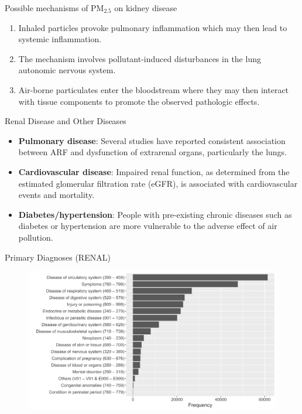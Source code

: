 \documentclass[handout]{beamer} %
\begin{document}
\begin{frame}{Possible mechanisms of PM$_{2.5}$ on kidney disease}
    \begin{enumerate}
        \item Inhaled particles provoke pulmonary inflammation which may then lead to systemic inflammation.
        \item The mechanism involves pollutant-induced disturbances in the lung autonomic nervous system.
        \item Air-borne particulates enter the bloodstream where they may then interact with tissue components to promote the observed pathologic effects. 
    \end{enumerate}
\end{frame}

\begin{frame}{Renal Disease and Other Diseases}
    \begin{itemize}
        \item \textbf{Pulmonary disease}: Several studies have reported consistent association between ARF and dysfunction of extrarenal organs, particularly the lungs.
        \item \textbf{Cardiovascular disease}: Impaired renal function, as determined from the estimated glomerular filtration rate (eGFR), is associated with cardiovascular events and mortality.
        \item \textbf{Diabetes/hypertension}: People with pre-existing chronic diseases such as diabetes or hypertension are more vulnerable to the adverse effect of air pollution.
    \end{itemize}
\end{frame}

\begin{frame}{Primary Diagnoses (RENAL)}
    \label{frm:pri}
    \begin{figure}
        \centering
        \includegraphics[width=\textwidth]{img/appendix/Aim3/renal_pri.png}
    \end{figure}
\end{frame}
\end{document}
